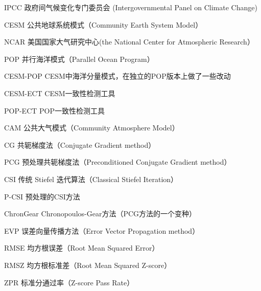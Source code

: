 \begin{denotation}[3cm]
\item[IPCC] 政府间气候变化专门委员会 (Intergovernmental Panel on Climate Change)
\item[CESM]  公共地球系统模式（Community Earth System Model）
\item[NCAR]  美国国家大气研究中心(the National Center for Atmospheric Research）
\item[POP]  并行海洋模式（Parallel Ocean Program）
\item[CESM-POP]  CESM中海洋分量模式，在独立的POP版本上做了一些改动
\item[CESM-ECT]  CESM一致性检测工具
\item[POP-ECT]  POP一致性检测工具
\item[CAM]  公共大气模式（Community Atmosphere Model）
\item[CG]	共轭梯度法（Conjugate Gradient method）
\item[PCG]  预处理共轭梯度法（Preconditioned Conjugate Gradient method）
\item[CSI]  传统 Stiefel 迭代算法（Classical Stiefel Iteration）
\item[P-CSI]  预处理的CSI方法
\item[ChronGear] Chronopoulos-Gear方法（PCG方法的一个变种）
\item[EVP] 误差向量传播方法（Error Vector Propagation method）
\item[RMSE] 均方根误差（Root Mean Squared Error）
\item[RMSZ] 均方根标准差（Root Mean Squared Z-score）
\item[ZPR] 标准分通过率（Z-score Pass Rate）
\end{denotation}

